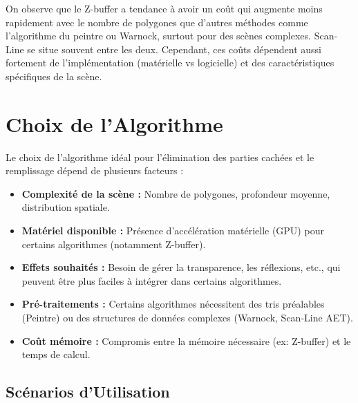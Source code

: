 \documentclass{article}
\begin{document}
On observe que le Z-buffer a tendance à avoir un coût qui augmente moins rapidement avec le nombre de polygones que d'autres méthodes comme l'algorithme du peintre ou Warnock, surtout pour des scènes complexes. Scan-Line se situe souvent entre les deux. Cependant, ces coûts dépendent aussi fortement de l'implémentation (matérielle vs logicielle) et des caractéristiques spécifiques de la scène.

\section{Choix de l'Algorithme}

Le choix de l'algorithme idéal pour l'élimination des parties cachées et le remplissage dépend de plusieurs facteurs :

\begin{itemize}
    \item \textbf{Complexité de la scène :} Nombre de polygones, profondeur moyenne, distribution spatiale.
    \item \textbf{Matériel disponible :} Présence d'accélération matérielle (GPU) pour certains algorithmes (notamment Z-buffer).
    \item \textbf{Effets souhaités :} Besoin de gérer la transparence, les réflexions, etc., qui peuvent être plus faciles à intégrer dans certains algorithmes.
    \item \textbf{Pré-traitements :} Certains algorithmes nécessitent des tris préalables (Peintre) ou des structures de données complexes (Warnock, Scan-Line AET).
    \item \textbf{Coût mémoire :} Compromis entre la mémoire nécessaire (ex: Z-buffer) et le temps de calcul.
\end{itemize}

\subsection{Scénarios d'Utilisation}
\end{document}

